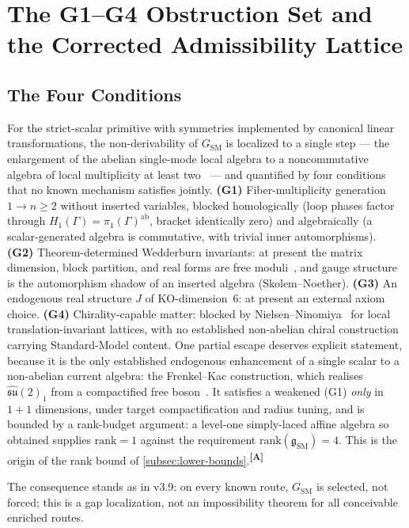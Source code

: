 \documentclass[12pt,a4paper,twoside]{article}
\theoremstyle{plain}
\theoremstyle{definition}
\theoremstyle{remark}
\newcommand{\catmark}[1]{\textsuperscript{\textsf{\textbf{[#1]}}}}
\begin{document}
\newpage
\section{The G1--G4 Obstruction Set and the Corrected Admissibility Lattice}
\label{sec:g1g4}

\subsection{The Four Conditions}
\label{subsec:g1g4-statement}

For the strict-scalar primitive with symmetries implemented by canonical
linear transformations, the non-derivability of $G_{\mathrm{SM}}$ is
localized to a single step --- the enlargement of the abelian single-mode
local algebra to a noncommutative algebra of local multiplicity at least
two~\cite{krajewski1998,paschkesitarz1998} --- and quantified by four conditions that no known mechanism
satisfies jointly. \textbf{(G1)} Fiber-multiplicity generation
$1 \to n \geq 2$ without inserted variables, blocked homologically (loop
phases factor through $H_1(\Gamma) = \pi_1(\Gamma)^{\mathrm{ab}}$, bracket
identically zero) and algebraically (a scalar-generated algebra is
commutative, with trivial inner automorphisms). \textbf{(G2)}
Theorem-determined Wedderburn invariants: at present the matrix dimension,
block partition, and real forms are free moduli~\cite{cacic2011}, and gauge structure is
the automorphism shadow of an inserted algebra (Skolem--Noether).
\textbf{(G3)} An endogenous real structure $J$ of KO-dimension~6: at
present an external axiom choice. \textbf{(G4)} Chirality-capable matter:
blocked by Nielsen--Ninomiya~\cite{nielsen1981} for local translation-invariant lattices,
with no established non-abelian chiral construction carrying
Standard-Model content. One partial escape deserves explicit statement, because it is the only
established endogenous enhancement of a single scalar to a non-abelian
current algebra: the Frenkel--Kac construction, which realises
$\widehat{\mathfrak{su}}(2)_1$ from a compactified free
boson~\cite{frenkelkac1980,goddardolive1986}. It satisfies a weakened
(G1) \emph{only} in $1{+}1$ dimensions, under target compactification
and radius tuning, and is bounded by a rank-budget argument: a level-one
simply-laced affine algebra so obtained supplies $\mathrm{rank} = 1$
against the requirement $\mathrm{rank}(\mathfrak g_{\mathrm{SM}}) = 4$.
This is the origin of the rank bound of
\cref{subsec:lower-bounds}.\catmark{A}

The consequence stands as in v3.9: on every known
route, $G_{\mathrm{SM}}$ is selected, not forced; this is a gap
localization, not an impossibility theorem for all conceivable enriched
routes.
\end{document}
